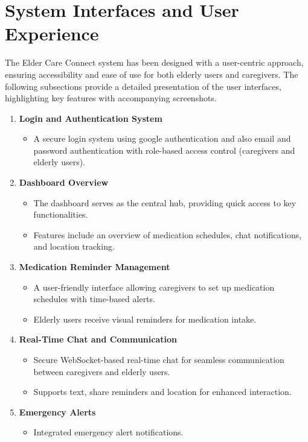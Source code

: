 \section{System Interfaces and User Experience}
The Elder Care Connect system has been designed with a user-centric approach, ensuring accessibility and ease of use for both elderly users and caregivers. The following subsections provide a detailed presentation of the user interfaces, highlighting key features with accompanying screenshots.
\begin{enumerate}
    \item \textbf{Login and Authentication System}
    \begin{itemize}
        \item A secure login system using google authentication and also email and password authentication with role-based access control (caregivers and elderly users).
    \end{itemize}
    \item \textbf{Dashboard Overview}
        \begin{itemize}
            \item The dashboard serves as the central hub, providing quick access to key functionalities.
            \item Features include an overview of medication schedules, chat notifications, and location tracking.
            \end{itemize}
    \item \textbf{Medication Reminder Management}
            \begin{itemize}
                \item A user-friendly interface allowing caregivers to set up medication schedules with time-based alerts.
                \item Elderly users receive visual reminders for medication intake.
            \end{itemize}
    \item \textbf{Real-Time Chat and Communication}
            \begin{itemize}
                \item Secure WebSocket-based real-time chat for seamless communication between caregivers and elderly users.
                \item Supports text, share reminders and location for enhanced interaction.
            \end{itemize}
    \item \textbf{Emergency Alerts}
                \begin{itemize}
                    \item Integrated emergency alert notifications.
                \end{itemize}             
\end{enumerate}
